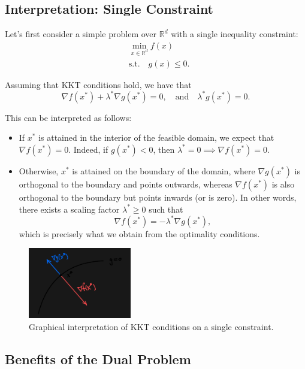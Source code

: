 \documentclass[11pt]{book} %
\begin{document}
\subsection{Interpretation: Single Constraint}

Let's first consider a simple problem over $\mathbb{R}^d$ with a single inequality constraint:
\begin{align*}
    & \min_{x \in \mathbb{R}^d} f(x) \\
    & \text{s.t.} \quad g(x) \leq 0.
\end{align*}

Assuming that KKT conditions hold, we have that
\[
    \nabla f(x^*) + \lambda^* \nabla g(x^*) = 0, \quad \text{and} \quad \lambda^* g(x^*) = 0.
\]

This can be interpreted as follows:

\begin{itemize}
    \item If $x^*$ is attained in the interior of the feasible domain, we expect that $\nabla f(x^*) = 0$. Indeed, if $g(x^*) < 0$, then $\lambda^* = 0 \implies \nabla f(x^*) = 0$.
    \item Otherwise, $x^*$ is attained on the boundary of the domain, where $\nabla g(x^*)$ is orthogonal to the boundary and points outwards, whereas $\nabla f(x^*)$ is also orthogonal to the boundary but points inwards (or is zero). In other words, there exists a scaling factor $\lambda^* \geq 0$ such that
    \[
        \nabla f(x^*) = -\lambda^* \nabla g(x^*),
    \]
    which is precisely what we obtain from the optimality conditions.
\end{itemize}


\begin{figure}[]
\centering
\includegraphics[width=0.4\textwidth]{Figs/kkt.png}
\caption{Graphical interpretation of KKT conditions on a single constraint.}
\label{fig:kkt}
\end{figure}


\subsection{Benefits of the Dual Problem}
\end{document}
